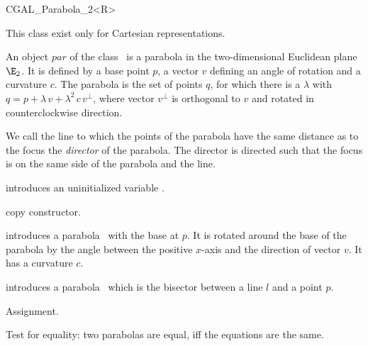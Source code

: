 

\begin {classtemplate} {CGAL_Parabola_2<R>}

This class exist only for Cartesian representations.

An object $par$ of the class \classname\ is a parabola in the
two-dimensional Euclidean plane $\E_2$. It is defined by a base point
$p$, a vector $v$ defining an angle of rotation and a curvature
$c$. The parabola is the set of points $q$, for which there is a
$\lambda$ with $q = p + \lambda \, v + \lambda^2 \, c \, v^\perp$, where
vector $v^\perp$ is orthogonal to $v$ and rotated in counterclockwise
direction.

We call the line to which the points of the parabola have
the same distance as to the focus the {\em director} of the parabola.
The director is directed such that the focus is on the same side of
the parabola and the line.

\creation
{}


\hidden {}
             {introduces an uninitialized variable \var.}

\hidden {}
 	    {copy constructor.}


\def\CCalternateThreeColumn{\CCtrue}

            {introduces a parabola \var\ with the base at $p$. 
             It is rotated around the base of the parabola by the angle 
             between the positive $x$-axis and the direction of vector $v$. 
             It has a curvature $c$.}

	    {introduces a parabola \var\ which is the bisector between
             a line $l$ and a point $p$.}

\operations
\threecolumns{3.5cm}{4cm}

\hidden {}
        {Assignment.}

       {Test for equality: two parabolas are equal, iff the equations
        are the same.}


\end{classtemplate}
